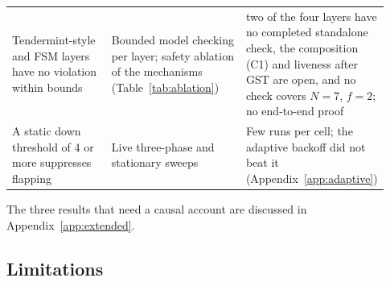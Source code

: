 \begin{table}[tbp]
\begin{tabular}{@{}>{\rcc}p{0.27\linewidth}>{\rcc}p{0.36\linewidth}>{\rcc}p{0.30\linewidth}@{}}
Tendermint-style and FSM layers have no violation within bounds & Bounded model checking per layer; safety ablation of the mechanisms (Table~\ref{tab:ablation}) & two of the four layers have no completed standalone check, the composition (C1) and liveness after GST are open, and no check covers $N{=}7$, $f{=}2$; no end-to-end proof \\
A static down threshold of 4 or more suppresses flapping & Live three-phase and stationary sweeps & Few runs per cell; the adaptive backoff did not beat it (Appendix~\ref{app:adaptive}) \\
\bottomrule
\end{tabular}
\end{table}

The three results that need a causal account are discussed in Appendix~\ref{app:extended}.

\subsection{Limitations}
\label{subsec:limitations}

